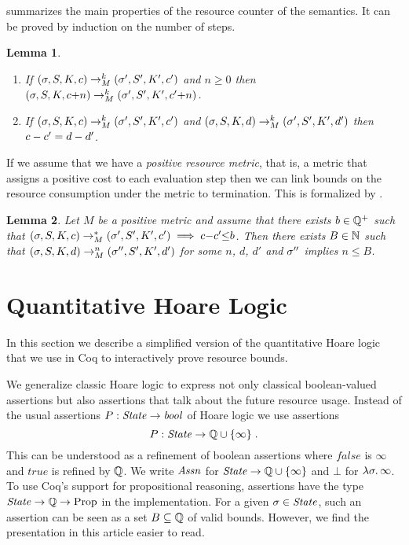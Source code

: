 \documentclass[nocopyrightspace,preprint]{sigplanconf}
\newcommand{\pref}[1]{\prettyref{#1}}
\newtheorem{lemma}{Lemma}
\begin{document}
\pref{lem:sem1} summarizes the main properties of the resource
counter of the semantics.  It can be proved by induction on the number
of steps.
\begin{lemma}
\label{lem:sem1}
  \begin{enumerate}
  \item If $(\sigma, S, K, c) \to_{M}^k (\sigma', S',
    K', c')$ and $n\ge 0$ then $(\sigma, S, K, c {+} n)
    \to_{M}^k (\sigma', S', K', c' {+} n)$.
  \item If $(\sigma, S, K, c) \to_{M}^k (\sigma', S',
    K', c')$ and $(\sigma, S, K, d) \to_{M}^k (\sigma', S',
    K', d')$ then $c - c' = d - d'$.
  \end{enumerate}
\end{lemma}
%
If we assume that we have a \emph{positive resource metric}, that is,
a metric that assigns a positive cost to each evaluation step then we
can link bounds on the resource consumption under the metric to
termination.  This is formalized by \pref{lem:sem_term}.
%
\begin{lemma}
 \label{lem:sem_term}
 Let $M$ be a positive metric and assume that there exists $b \in
 \mathbb{Q^+}$ such that $(\sigma, S, K, c) \to_{M}^*
 (\sigma', S', K', c') \implies c {-} c' {\leq} b$.
 Then there exists $B \in \mathbb{N}$ such that $(\sigma, S, K, d)
 \to_{M}^n (\sigma'', S', K', d')$ for some $n$, $d$, $d'$
 and $\sigma''$ implies $n \le B$.
\end{lemma}


\section{Quantitative Hoare Logic}

In this section we describe a simplified version of the quantitative
Hoare logic that we use in Coq to interactively prove resource bounds.

We generalize classic Hoare logic to express not only classical
boolean-valued assertions but also assertions that talk about the
future resource usage.  Instead of the usual assertions $P : \mathit{State}
\to \mathit{bool}$ of Hoare logic we use assertions
$$
P : \mathit{State} \to \mathbb{Q} \cup \{ \infty \} \; .
$$
This can be understood as a refinement of boolean assertions where
$\mathit{false}$ is $\infty$ and $\mathit{true}$ is refined by $\mathbb{Q}$.
We write $\mathit{Assn}$ for $\mathit{State} \to \mathbb{Q} \cup \{ \infty \}$ and $\bot$ for
$\lambda \sigma . \, \infty$.  To use Coq's support for propositional
reasoning, assertions have the type $\mathit{State} \to \mathbb{Q} \to \mathrm{Prop}$
in the implementation.  For a given $\sigma \in \mathit{State}$, such an
assertion can be seen as a set $B \subseteq \mathbb{Q}$ of valid bounds.
However, we find the presentation in this article easier to read.
\end{document}
